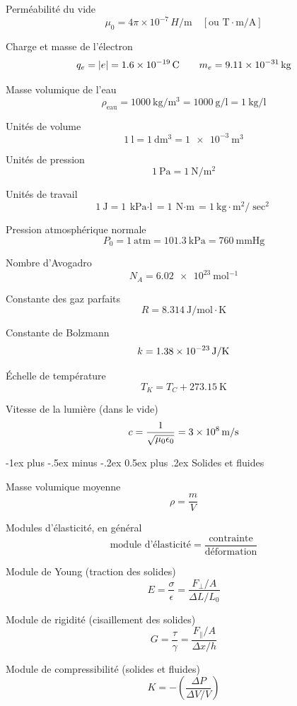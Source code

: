 \documentclass[10pt,landscape]{article}
\makeatletter
\renewcommand{\section}{\@startsection{section}{1}{0mm}%
                                {-1ex plus -.5ex minus -.2ex}%
                                {0.5ex plus .2ex}%
                                {\normalfont\large\bfseries}}
\makeatother
\begin{document}
\begin{multicols}{3}
Perméabilité du vide
\[ \mu_0 = 4\pi \times 10^{-7} \,\si{H/\meter} \quad [\text{ou }\si{\tesla\cdot\meter/\ampere}] \]

Charge et masse de l'électron
\begin{gather*}
q_e = |e| = \SI{1,6E-19}{\coulomb}
\qquad m_e = \SI{9,11E-31}{\kilogram}
\end{gather*}

Masse volumique de l'eau
\[ \rho_\text{eau} = \SI{1000}{\kilogram/\meter^3} = \SI{1000}{\gram/\litre}  = \SI{1}{\kilogram/\litre} \]

Unités de volume
\[ \SI{1}{\litre} = \SI{1}{\deci\meter^3} =  \SI{1e-3}{\meter^3} \]

Unités de pression
\[ \SI{1}{\pascal} = \SI{1}{\newton/\meter^2} \]

Unités de travail
\[ \SI{1}{\joule} = \SI{1}{\kilo\pascal\cdot\litre} = \SI{1}{\newton\cdot\meter} = \SI{1}{\kilo\gram\cdot\metre^2/\sec^2} \]

Pression atmosphérique normale
\[ P_0 = \SI{1}{\text{atm}} = \SI{101,3}{\kilo\pascal}
= \SI{760}{\mmHg} \]

Nombre d'Avogadro
\[ N_A = \SI{6,02e23}{\mol^{-1}}\]

Constante des gaz parfaits
\[ R = \SI{8,314}{\joule/\mole\cdot\kelvin} \]

Constante de Bolzmann
\[ k = \SI{1,38E-23}{\joule/\kelvin} \]

Échelle de température
\[ T_K = T_C + \SI{273,15}{\kelvin} \]

Vitesse de la lumière (dans le vide)
\[ c = \frac{1}{\sqrt{\mu_0 \epsilon_0}} = \SI{3E8}{\meter/\second}  \]

\hrulefill


\section{Solides et fluides}

Masse volumique moyenne
\[ \rho = \frac{m}{V} \]

Modules d'élasticité, en général
\[ \text{module d'élasticité} = \frac{\text{contrainte}}{\text{déformation}} \]

Module de Young (traction des solides)
\[ E = \frac{\sigma}{\epsilon} 
= \frac{{F_\perp}/{A}}{{\Delta L}/{L_0}} 
\]

Module de rigidité (cisaillement des solides)
\[ G = \frac{\tau}{\gamma} 
= \frac{F_\parallel/A}{{\Delta x}/{h}} 
\]

Module de compressibilité (solides et fluides)
\[ K = - \left(\frac{\Delta P}{\Delta V / V} \right)\]


\end{multicols}
\end{document}
